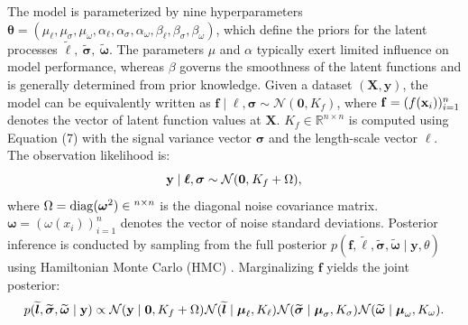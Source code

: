 \documentclass[]{interact}
\theoremstyle{plain}%
\theoremstyle{definition}
\theoremstyle{remark}
\begin{document}
The model is parameterized by nine hyperparameters ${\boldsymbol{\theta}} = ({\mu _\ell },{\mu _\sigma },{\mu _\omega },{\alpha _\ell },{\alpha _\sigma },{\alpha _\omega },{\beta _\ell },{\beta _\sigma },{\beta _\omega })$, which define the priors for the latent processes $\widetilde{\boldsymbol{\ell}},\ \widetilde{\boldsymbol{\sigma}},\ \widetilde{\boldsymbol{\omega}}$. The parameters $\mu$ and $\alpha$ typically exert limited influence on model performance, whereas $\beta$ governs the smoothness of the latent functions and is generally determined from prior knowledge. Given a dataset $(\mathbf{X}, \mathbf{y})$, the model can be equivalently written as $\mathbf{f} \mid \boldsymbol{\ell}, \boldsymbol{\sigma} \sim \mathcal{N}(\mathbf{0}, K_{f})$, where $\mathbf{f} = (f({\bf{x}}_{i}))_{i=1}^{n}$ denotes the vector of latent function values at $\mathbf{X}$. $K_{f} \in \mathbb{R}^{n \times n}$ is computed using Equation (7) with the signal variance vector $\boldsymbol{\sigma}$ and the length-scale vector $\boldsymbol{\ell}$. The observation likelihood is:
\begin{equation}
	{\bf{y}}\mid {\boldsymbol{\ell}},{\boldsymbol{\sigma}}\sim{\cal N}({\bf{0}},{\mkern 1mu} {K_f} + \Omega ),
\end{equation}
where $\Omega  = {\mathop{\rm diag}\nolimits} ({{\boldsymbol{\omega }}^2}) \in {^{n \times n}}$ is the diagonal noise covariance matrix. $\boldsymbol{\omega}=(\omega(x_i))_{i=1}^n$ denotes the vector of noise standard deviations. Posterior inference is conducted by sampling from the full posterior $p(\mathbf{f}, \tilde{\boldsymbol{\ell}}, \tilde{\boldsymbol{\sigma}}, \tilde{\boldsymbol{\omega}} \mid \mathbf{y}, \theta)$ using Hamiltonian Monte Carlo (HMC) \citep{Gelman2013, Hoffman2014}. Marginalizing $\mathbf{f}$ yields the joint posterior:
\begin{equation}
	p(\widetilde{\boldsymbol{l}},\widetilde{\boldsymbol{\sigma}},\widetilde{\boldsymbol{\omega}}\mid {\bf{y}}) 
	\propto 
	\mathcal{N}({\bf{y}}\mid {\bf{0}},{K_f} + \Omega ){\mkern 1mu} 
	\mathcal{N}(\widetilde{\boldsymbol{l}}\mid {\boldsymbol{\mu}}_\ell ,{K_\ell}){\mkern 1mu} 
	\mathcal{N}(\widetilde{\boldsymbol{\sigma}}\mid {\boldsymbol{\mu}}_\sigma ,{K_\sigma}){\mkern 1mu} 
	\mathcal{N}(\widetilde{\boldsymbol{\omega}}\mid {\boldsymbol{\mu}}_\omega ,{K_\omega}).
\end{equation}
\end{document}
